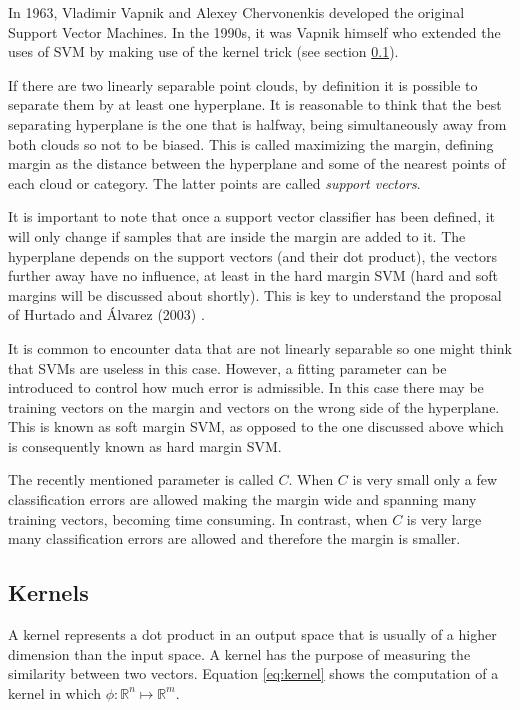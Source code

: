 In 1963, Vladimir Vapnik and Alexey Chervonenkis developed the original Support Vector Machines. In the 1990s, it was Vapnik himself who extended the uses of \ac{SVM} by making use of the kernel trick (see section \ref{sec:kernel}).

If there are two linearly separable point clouds, by definition it is possible to separate them by at least one hyperplane. It is reasonable to think that the best separating hyperplane is the one that is halfway, being simultaneously away from both clouds so not to be biased. This is called maximizing the margin, defining margin as the distance between the hyperplane and some of the nearest points of each cloud or category. The latter points are called \emph{support vectors}.

It is important to note that once a support vector classifier has been defined, it will only change if samples that are inside the margin are added to it. The hyperplane depends on the support vectors (and their dot product), the vectors further away have no influence, at least in the hard margin \ac{SVM} (hard and soft margins will be discussed about shortly). This is key to understand the proposal of Hurtado and Álvarez (2003) \cite{Hurtado2003}.

It is common to encounter data that are not linearly separable so one might think that \ac{SVM}s are useless in this case. However, a fitting parameter can be introduced to control how much error is admissible. In this case there may be training vectors on the margin and vectors on the wrong side of the hyperplane. This is known as soft margin \ac{SVM}, as opposed to the one discussed above which is consequently known as hard margin \ac{SVM}.

The recently mentioned parameter is called \(C\). When \(C\) is very small only a few classification errors are allowed making the margin wide and spanning many training vectors, becoming time consuming. In contrast, when \(C\) is very large many classification errors are allowed and therefore the margin is smaller.

\subsection{Kernels} \label{sec:kernel}

A kernel represents a dot product in an output space that is usually of a higher dimension than the input space. A kernel has the purpose of measuring the similarity between two vectors. Equation \ref{eq:kernel} shows the computation of a kernel in which \(\phi: \mathbb{R}^n \mapsto \mathbb{R}^m\).

